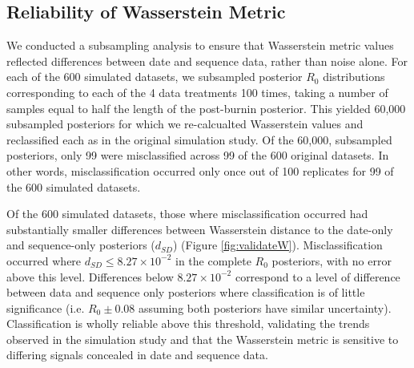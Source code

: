 \documentclass{article}
\begin{document}
\subsection*{Reliability of Wasserstein Metric}


We conducted a subsampling analysis to ensure that Wasserstein metric values reflected differences between date and sequence data, rather than noise alone. For each of the 600 simulated datasets, we subsampled posterior $R_{0}$ distributions corresponding to each of the 4 data treatments 100 times, taking a number of samples equal to half the length of the post-burnin posterior. This yielded 60,000 subsampled posteriors for which we re-calcualted Wasserstein values and reclassified each as in the original simulation study. Of the 60,000, subsampled posteriors, only 99 were misclassified across 99 of the 600 original datasets. In other words, misclassification occurred only once out of 100 replicates for 99 of the 600 simulated datasets.

Of the 600 simulated datasets, those where misclassification occurred had substantially smaller differences between Wasserstein distance to the date-only and sequence-only posteriors ($d_{SD}$) (Figure \ref{fig:validateW}). Misclassification occurred where $d_{SD} \le 8.27\times10^{-2}$ in the complete $R_0$ posteriors, with no error above this level. Differences below $8.27\times10^{-2}$ correspond to a level of difference between data and sequence only posteriors where classification is of little significance (i.e. $R_0 \pm 0.08$ assuming both posteriors have similar uncertainty). Classification is wholly reliable above this threshold, validating the trends observed in the simulation study and that the Wasserstein metric is sensitive to differing signals concealed in date and sequence data.
\end{document}
